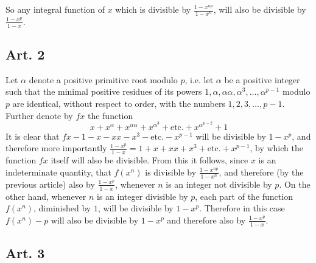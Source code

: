 \documentclass{book}
\theoremstyle{plain}
\theoremstyle{remark}
\begin{document}
So any integral function of $x$ which is divisible by $\frac{1-x^{np}}{1-x^n}$, will also be divisible by $\frac{1-x^p}{1-x}$.

\subsection*{Art. 2} 

Let $\alpha$ denote a positive primitive root modulo $p$, i.e. let $\alpha$ be a positive integer such that the minimal positive residues of its powers $1, \alpha, \alpha\alpha, \alpha^3, \dots, \alpha^{p-1}$ modulo $p$ are identical, without respect to order, with the numbers $1,2,3,\dots,p-1$.  Further denote by $fx$ the function
\[ x + x^{\alpha} + x^{\alpha\alpha} + x^{\alpha^3} + \textrm{etc.} + x^{\alpha^{p-2}}+1 \]
It is clear that $fx - 1 - x - xx - x^3 - \textrm{etc.}-x^{p-1}$ will be divisible by $1-x^p$, and therefore more importantly $\frac{1-x^p}{1-x} = 1 + x + xx + x^3 + \textrm{etc.}+x^{p-1}$, by which the function $fx$ itself will also be divisible.  From this it follows, since $x$ is an indeterminate quantity, that $f(x^n)$ is divisible by $\frac{1-x^{np}}{1-x^n}$, and therefore (by the previous article) also by $\frac{1-x^p}{1-x}$, whenever $n$ is an integer not divisible by $p$.  On the other hand, whenever $n$ is an integer divisible by $p$, each part of the function $f(x^n)$, diminished by $1$,  will be divisible by $1-x^p$.  Therefore in this case  $f(x^n)-p$ will also be divisible by $1-x^p$ and therefore also by $\frac{1-x^p}{1-x}$. 

\subsection*{Art. 3}
\end{document}
